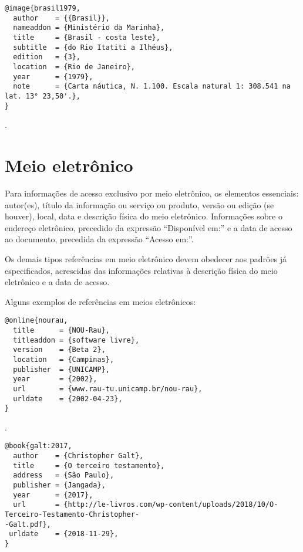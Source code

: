 \begin{verbatim}
@image{brasil1979,
  author    = {{Brasil}},
  nameaddon = {Ministério da Marinha},
  title     = {Brasil - costa leste},
  subtitle  = {do Rio Itatiti a Ilhéus},
  edition   = {3},
  location  = {Rio de Janeiro},
  year      = {1979},
  note      = {Carta náutica, N. 1.100. Escala natural 1: 308.541 na lat. 13° 23,50'.},
}
\end{verbatim}

\noindent
{}.


\section{Meio eletrônico}

Para informações de acesso exclusivo por meio eletrônico, os elementos essenciais: autor(es), título da informação ou serviço ou produto, versão ou edição (se houver), local, data e descrição física do meio eletrônico. Informações sobre o endereço eletrônico, precedido da expressão ``Disponível em:'' e a data de acesso ao documento, precedida da expressão ``Acesso em:''.

Os demais tipos referências em meio eletrônico devem obedecer aos padrões já especificados, acrescidas das informações relativas à descrição física do meio eletrônico e a data de acesso.


Alguns exemplos de referências em meios eletrônicos:

\vspace*{1em}

\begin{verbatim}
@online{nourau,
  title      = {NOU-Rau},
  titleaddon = {software livre},
  version    = {Beta 2},
  location   = {Campinas},
  publisher  = {UNICAMP},
  year       = {2002},
  url        = {www.rau-tu.unicamp.br/nou-rau},
  urldate    = {2002-04-23},
}
\end{verbatim}

\noindent
{}.

\vspace*{1em}

\begin{verbatim}
@book{galt:2017,
  author    = {Christopher Galt},
  title     = {O terceiro testamento},
  address   = {São Paulo},
  publisher = {Jangada},
  year      = {2017},
  url       = {http://le-livros.com/wp-content/uploads/2018/10/O-Terceiro-Testamento-Christopher-
-Galt.pdf},
 urldate    = {2018-11-29},
}
\end{verbatim}

